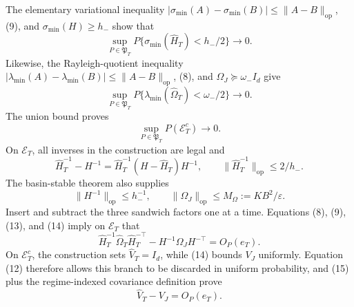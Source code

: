 The elementary variational inequality \(|\sigma_{\min}(A)-\sigma_{\min}(B)|\le\|A-B\|_{\mathrm{op}}\), (9), and \(\sigma_{\min}(H)\ge h_-\) show that
\[
 \sup_{P\in\mathfrak P_T}P\{\sigma_{\min}(\widehat H_T)<h_-/2\}\to0. \tag{10}
\]
Likewise, the Rayleigh-quotient inequality \(|\lambda_{\min}(A)-\lambda_{\min}(B)|\le\|A-B\|_{\mathrm{op}}\), (8), and \(\Omega_J\succeq\omega_-I_d\) give
\[
 \sup_{P\in\mathfrak P_T}P\{\lambda_{\min}(\widehat\Omega_T)<\omega_-/2\}\to0. \tag{11}
\]
The union bound proves
\[
 \sup_{P\in\mathfrak P_T}P(\mathcal E_T^c)\longrightarrow0. \tag{12}
\]
On \(\mathcal E_T\), all inverses in the construction are legal and
\[
 \widehat H_T^{-1}-H^{-1}
 =\widehat H_T^{-1}(H-\widehat H_T)H^{-1},
 \qquad \|\widehat H_T^{-1}\|_{\mathrm{op}}\le2/h_-. \tag{13}
\]
The basin-stable theorem also supplies
\[
 \|H^{-1}\|_{\mathrm{op}}\le h_-^{-1},
 \qquad \|\Omega_J\|_{\mathrm{op}}\le M_\Omega:=KB^2/\varepsilon. \tag{14}
\]
Insert and subtract the three sandwich factors one at a time. Equations (8), (9), (13), and (14) imply on \(\mathcal E_T\) that
\[
 \widehat H_T^{-1}\widehat\Omega_T\widehat H_T^{-\top}
 -H^{-1}\Omega_JH^{-\top}=O_P(e_T). \tag{15}
\]
On \(\mathcal E_T^c\), the construction sets \(\widehat V_T=I_d\), while (14) bounds \(V_J\) uniformly. Equation (12) therefore allows this branch to be discarded in uniform probability, and (15) plus the regime-indexed covariance definition prove
\[
 \widehat V_T-V_J=O_P(e_T). \tag{16}
\]

